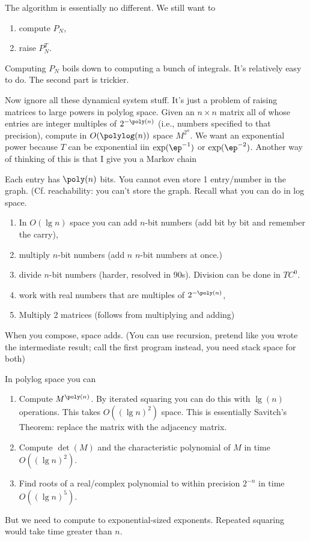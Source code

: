 The algorithm is essentially no different. We still want to 
\begin{enumerate}
\item
compute $P_N$,
\item
raise $P_N^T$.
\end{enumerate}

Computing $P_N$ boils down to computing a bunch of integrals. It's relatively easy to do. The second part is trickier.

Now ignore all these dynamical system stuff. It's just a problem of raising matrices to large powers in polylog space. Given an $n\times n$ matrix all of whose entries are integer multiples of $2^{-\poly(n)}$ (i.e., numbers specified to that precision), compute in $O(\polylog(n))$ space $M^{2^n}$. We want an exponential power because $T$ can be exponential iin $\exp(\ep^{-1})$ or $\exp(\ep^{-2})$. Another way of thinking of this is that I give you a Markov chain

Each entry has $\poly(n)$ bits. You cannot even store 1 entry/number in the graph. (Cf. reachability: you can't store the graph. Recall what you can do in log space. 
\begin{enumerate}
\item
In $O(\lg n)$ space you can add $n$-bit numbers (add bit by bit and remember the carry), 
\item multiply $n$-bit numbers (add $n$ $n$-bit numbers at once.)
\item
divide $n$-bit numbers (harder, resolved in 90s). Division can be done in $TC^0$.
\item
work with real numbers that are multiples of $2^{-\poly(n)}$,
\item
Multiply 2 matrices (follows from multiplying and adding)
\end{enumerate}
When you compose, space adds. (You can use recursion, pretend like you wrote the intermediate result; call the first program instead, you need stack space for both)

In polylog space you can 
\begin{enumerate}
\item
Compute $M^{\poly(n)}$. By iterated squaring you can do this with $\lg(n)$ operations. This takes $O((\lg n)^2)$ space. This is essentially Savitch's Theorem: replace the matrix with the adjacency matrix.
\item
Compute $\det(M)$ and the characteristic polynomial of $M$ in time $O((\lg n)^2)$.
\item
Find roots of a real/complex polynomial to within precision $2^{-n}$ in time $O((\lg n)^5)$. 
\end{enumerate}
But we need to compute to exponential-sized exponents. Repeated squaring would take time greater than $n$.

